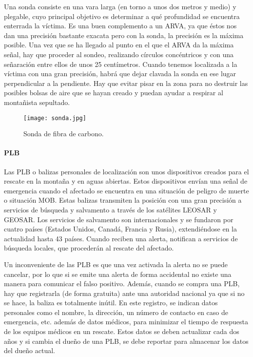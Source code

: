 Una sonda consiste en una vara larga (en torno a unos dos metros y medio) y plegable, cuyo principal objetivo es determinar a qué profundidad se encuentra enterrada la víctima. Es una buen complemento a un \ac{ARVA}, ya que éstos nos dan una precisión bastante exacata pero con la sonda, la precisión es la máxima posible. Una vez que se ha llegado al punto en el que el \ac{ARVA} da la máxima señal, hay que proceder al sondeo, realizando círculos concéntricos y con una señaración entre ellos de unos 25 centímetros. Cuando tenemos localizada a la víctima con una gran precisión, habrá que dejar clavada la sonda en ese lugar perpendicular a la pendiente. Hay que evitar pisar en la zona para no destruir las posibles bolsas de aire que se hayan creado y puedan ayudar a respirar al montañista sepultado.

\begin{figure}[!h]
\begin{center}
\texttt{[image: sonda.jpg]}
\caption{Sonda de fibra de carbono. \protect\footnotemark}
\label{fig:sonda}
\end{center}
\end{figure}


\paragraph{\acs{PLB}}

Las \ac{PLB} o balizas personales de localización son unos dispositivos creados para el rescate en la montaña y en aguas abiertas. Estos dispositivos envían una señal de emergencia cuando el afectado se encuentra en una situación de peligro de muerte o situación \ac{MOB}. Estas balizas transmiten la posición con una gran precisión a servicios de búsqueda y salvamento a través de los satélites \ac{LEOSAR} y \ac{GEOSAR}. Los servicios de salvamento son internacionales y se fundaron por cuatro países (Estados Unidos, Canadá, Francia y Rusia), extendiéndose en la actualidad hasta 43 países. Cuando reciben una alerta, notifican a servicios de búsqueda locales, que procederán al rescate del afectado.

Un inconveniente de las \ac{PLB} es que una vez activada la alerta no se puede cancelar, por lo que si se emite una alerta de forma accidental no existe una manera para comunicar el falso positivo. Además, cuando se compra una \ac{PLB}, hay que registrarla (de forma gratuita) ante una autoridad nacional ya que si no se hace, la baliza es totalmente inútil. En este registro, se indican datos personales como el nombre, la dirección, un número de contacto en caso de emergencia, etc. además de datos médicos, para minimizar el tiempo de respuesta de los equipos médicos en un rescate. Estos datos se deben actualizar cada dos años y si cambia el dueño de una \ac{PLB}, se debe reportar para almacenar los datos del dueño actual. 


